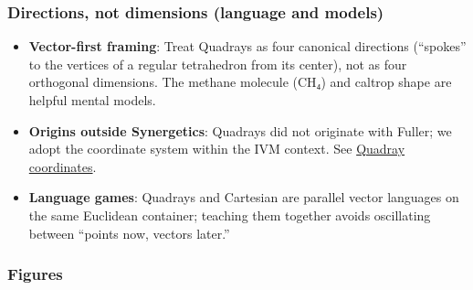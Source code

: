 \documentclass[
  10pt,
]{article}
\providecommand{\tightlist}{%
  \setlength{\itemsep}{0pt}\setlength{\parskip}{0pt}}
\begin{document}
\hypertarget{directions-not-dimensions-language-and-models}{%
\subsubsection{Directions, not dimensions (language and
models)}\label{directions-not-dimensions-language-and-models}}

\begin{itemize}
\tightlist
\item
  \textbf{Vector-first framing}: Treat Quadrays as four canonical
  directions (``spokes'' to the vertices of a regular tetrahedron from
  its center), not as four orthogonal dimensions. The methane molecule
  (CH₄) and caltrop shape are helpful mental models.
\item
  \textbf{Origins outside Synergetics}: Quadrays did not originate with
  Fuller; we adopt the coordinate system within the IVM context. See
  \href{https://en.wikipedia.org/wiki/Quadray_coordinates}{Quadray
  coordinates}.
\item
  \textbf{Language games}: Quadrays and Cartesian are parallel vector
  languages on the same Euclidean container; teaching them together
  avoids oscillating between ``points now, vectors later.''
\end{itemize}

\hypertarget{figures}{%
\subsubsection{Figures}\label{figures}}
\end{document}
